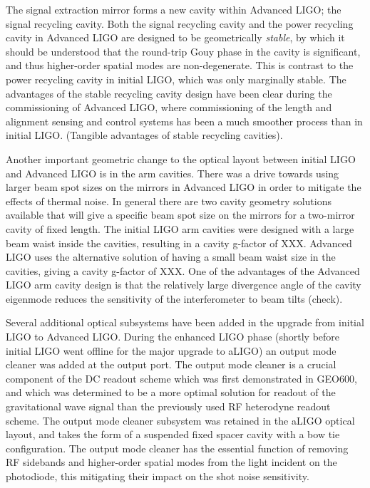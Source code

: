 The signal extraction mirror forms a new cavity within Advanced LIGO; the signal recycling cavity. 
Both the signal recycling cavity and the power recycling cavity in Advanced LIGO are designed to be 
geometrically \emph{stable}, by which it should be understood that the round-trip Gouy phase in the cavity 
is significant, and thus higher-order spatial modes are non-degenerate. 
This is contrast to the power recycling cavity in initial LIGO, which was only marginally stable. 
The advantages of the stable recycling cavity design have been clear during the commissioning of 
Advanced LIGO, where commissioning of the length and alignment sensing and control systems has 
been a much smoother process than in initial LIGO. (Tangible advantages of stable recycling cavities). 

Another important geometric change to the optical layout between initial LIGO and Advanced LIGO is 
in the arm cavities. There was a drive towards using larger beam spot sizes on the mirrors in Advanced 
LIGO in order to mitigate the effects of thermal noise. In general there are two cavity geometry solutions available 
that will give a specific beam spot size on the mirrors for a two-mirror cavity of fixed length. The initial LIGO 
arm cavities were designed with a large beam waist inside the cavities, resulting in a cavity g-factor of XXX. 
Advanced LIGO uses the alternative solution of having a small beam waist size in the cavities, giving a cavity g-factor of XXX. 
One of the advantages of the Advanced LIGO arm cavity design is that the relatively large divergence angle of the cavity 
eigenmode reduces the sensitivity of the interferometer to beam tilts (check). 

Several additional optical subsystems have been added in the upgrade from initial LIGO to Advanced LIGO. 
During the enhanced LIGO phase (shortly before initial LIGO went offline for the major upgrade to aLIGO) an output
mode cleaner was added at the output port. The output mode cleaner is a crucial component of the DC readout 
scheme which was first demonstrated in GEO600, and which was determined to be a more optimal solution for 
readout of the gravitational wave signal than the previously used RF heterodyne readout scheme. The output mode 
cleaner subsystem was retained in the aLIGO optical layout, and takes the form of a suspended fixed spacer cavity 
with a bow tie configuration. The output mode cleaner has the essential function of removing RF sidebands and higher-order 
spatial modes from the light incident on the photodiode, this mitigating their impact on the shot noise sensitivity. 

